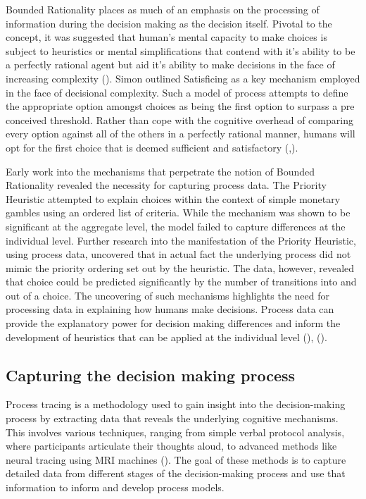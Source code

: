 \documentclass[man, floatsintext]{apa7}
\begin{document}
Bounded Rationality places as much of an emphasis on the processing of information during the decision making as the decision itself. Pivotal to the concept, it was suggested that human's mental capacity to make choices is subject to heuristics or mental simplifications that contend with it's ability to be a perfectly rational agent but aid it's ability to make decisions in the face of increasing complexity (\cite{payneTaskComplexityContingent1976}).  Simon outlined Satisficing as a key mechanism employed in the face of decisional complexity. Such a model of process attempts to define the appropriate option amongst choices as being the first option to surpass a pre conceived threshold. Rather than cope with the cognitive overhead of comparing every option against all of the others in a perfectly rational manner, humans will opt for the first choice that is deemed sufficient and satisfactory (\cite{simonBehavioralModelRational1955},\citeyear{simonRationalChoiceStructure1956d}).

Early work into the mechanisms that perpetrate the notion of Bounded Rationality revealed the necessity for capturing process data. The Priority Heuristic attempted to explain choices within the context of simple monetary gambles using an ordered list of criteria. While the mechanism was shown to be significant at the aggregate level, the model failed to capture differences at the individual level. Further research into the manifestation of the Priority Heuristic, using process data, uncovered that in actual fact the underlying process did not mimic the priority ordering set out by the heuristic. The data, however, revealed that choice could be predicted significantly by the number of transitions into and out of a choice. The uncovering of such mechanisms highlights the need for processing data in explaining how humans make decisions. Process data can provide the explanatory power for decision making differences and inform the development of heuristics that can be applied at the individual level (\cite{brandstatterPriorityHeuristicMaking2006}), (\cite{willemsenVisitingDecisionFactory2011}).

\subsection{Capturing the decision making process}

Process tracing is a methodology used to gain insight into the decision-making process by extracting data that reveals the underlying cognitive mechanisms. This involves various techniques, ranging from simple verbal protocol analysis, where participants articulate their thoughts aloud, to advanced methods like neural tracing using MRI machines (\cite{fordProcessTracingMethods1989}). The goal of these methods is to capture detailed data from different stages of the decision-making process and use that information to inform and develop process models.
\end{document}
